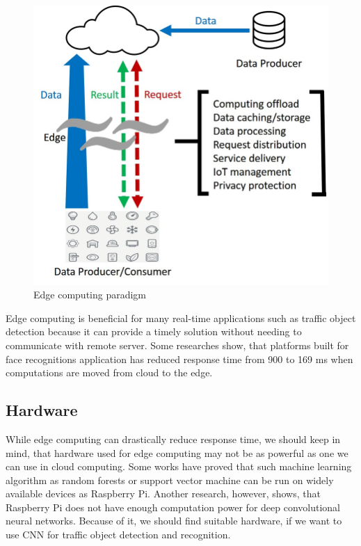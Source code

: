 \documentclass[twoside]{ctuthesis}
\theoremstyle{plain}
\theoremstyle{definition}
\theoremstyle{note}
\begin{document}
\begin{figure}[h]
\caption{Edge computing paradigm\cite{shi_cao_zhang_li_xu_2016}}
\label{edge computing}
\includegraphics[width=.7\textwidth]{images/introduction/Edge-computing-paradigm.png}
\end{figure}

Edge computing is beneficial for many real-time applications such as traffic object detection because it can provide a timely solution without needing to communicate with remote server. Some researches \cite{yi_hao_qin_li_2015} show, that platforms built for face recognitions application has reduced response time from 900 to 169 ms when computations are moved from cloud to the edge. 

\subsection{Hardware}
\label{section:nvidia_jetson}

While edge computing can drastically reduce response time, we should keep in mind, that hardware used for edge computing may not be as powerful as one we can use in cloud computing. Some works have proved \cite{yazici_basurra_gaber_2018} that such machine learning algorithm as random forests or support vector machine can be run on widely available devices as Raspberry Pi. Another research\cite{ostby_2018}, however, shows, that Raspberry Pi does not have enough computation power for deep convolutional neural networks. Because of it, we should find suitable hardware, if we want to use CNN for traffic object detection and recognition.
\end{document}
